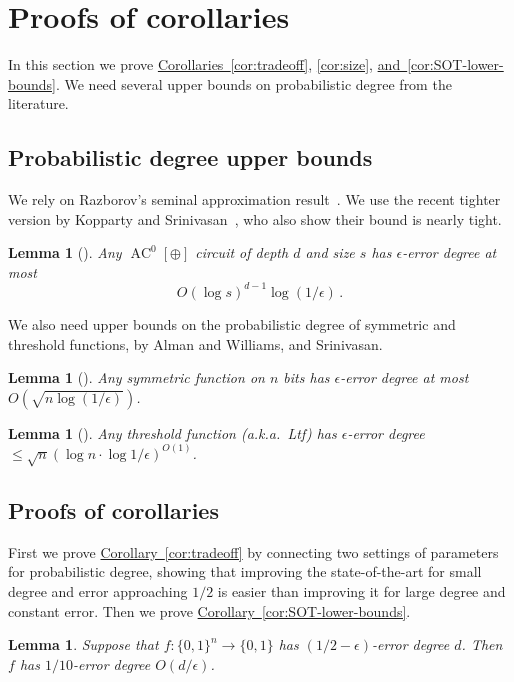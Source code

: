 \documentclass[11pt]{article}
\newcommand{\expref}[2]{\texorpdfstring{\hyperref[#2]{#1~\ref{#2}}}{#1~\ref{#2}}}
\newtheorem{lem}[theorem]{Lemma}  %
\DeclareMathOperator{\AC}{\mathrm{AC}}  %
\newcommand{\zo}{\{0, 1\}}
\newcommand{\e}{\epsilon}
\begin{document}
\section{Proofs of corollaries \label{sec:Proofs-of-corollaries}}

In this section we prove \expref{Corollaries}{cor:tradeoff}, \ref{cor:size},
\expref{and}{cor:SOT-lower-bounds}.  %
We need several upper bounds on probabilistic
degree from the literature.

\subsection{Probabilistic degree upper bounds}

We rely on Razborov's seminal approximation result~\cite{Raz87}.
We use the recent tighter version by
Kopparty and Srinivasan~\cite{DBLP:journals/toc/Kopparty018},
who also show their bound is nearly tight.
\begin{lem}[{\cite{DBLP:journals/toc/Kopparty018}}]
 \label{lem:approx-KS}Any $\AC^{0}[\oplus]$
circuit of depth $d$ and size $s$ has $\e$-error degree
%
%
at most
\[ O(\log s)^{d-1}\log(1/\e)\,. \]  %
\end{lem}

We also need upper bounds on the probabilistic degree of symmetric
and threshold functions, by Alman and Williams, and Srinivasan.
\begin{lem}[{\cite[Theorem 1.2]{DBLP:conf/focs/AlmanW15}}]\label{lem:AW-maj}
Any symmetric function on $n$ bits has $\e$-error
%
%
%
degree
at most  %
%
$O(\sqrt{n\log(1/\e)})$.
\end{lem}


\begin{lem}[{\cite[Theorem 12]{DBLP:conf/fsttcs/Srinivasan13}}]
\label{lem:Sri-LTF}
Any threshold function (a.k.a.~Ltf)
has $\e$-error degree $\le\sqrt{n}(\log n\cdot\log1/\e)^{O(1)}$.
\end{lem}


\subsection{Proofs of corollaries}

First we prove \expref{Corollary}{cor:tradeoff} by connecting two settings
of parameters for probabilistic degree, showing that improving the
state-of-the-art for small degree and error approaching $1/2$ is
easier than improving it for large degree and constant error. Then
we prove \expref{Corollary}{cor:SOT-lower-bounds}.
\begin{lem}
\label{lem:connection-tradeoff}Suppose that $f:\zo^{n}\to\zo$ has
$(1/2-\e)$-error degree $d$. Then $f$ has $1/10$-error degree
$O(d/\e)$.
\end{lem}
\end{document}
